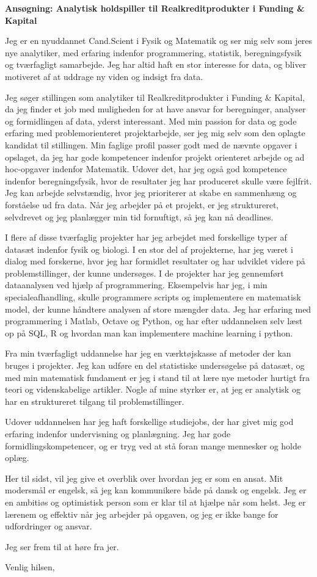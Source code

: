 \documentclass[12pt,a4paper]{letter}
\begin{document}
\begin{letter}{}
\opening{\textbf{Ansøgning: Analytisk holdspiller til Realkreditprodukter i Funding \& Kapital}} 

Jeg er en nyuddannet Cand.Scient i Fysik og Matematik og ser mig selv som jeres nye analytiker, med erfaring indenfor programmering, statistik, beregningsfysik og tværfagligt samarbejde. Jeg har altid haft en stor interesse for data, og bliver motiveret af at uddrage ny viden og indsigt fra data.

Jeg søger stillingen som analytiker til Realkreditprodukter i Funding \& Kapital, da jeg finder et job med muligheden for at have ansvar for beregninger, analyser og formidlingen af data, yderst interessant. Med min passion for data og gode erfaring med problemorienteret projektarbejde, ser jeg mig selv som den oplagte kandidat til stillingen. Min faglige profil passer godt med de nævnte opgaver i opslaget, da jeg har gode kompetencer indenfor projekt orienteret arbejde og ad hoc-opgaver indenfor Matematik. Udover det, har jeg også god kompetence indenfor beregningsfysik, hvor de resultater jeg har produceret skulle være fejlfrit. Jeg kan arbejde selvstændig, hvor jeg prioriterer at skabe en sammenhæng og forståelse ud fra data. Når jeg arbejder på et projekt, er jeg struktureret, selvdrevet og jeg planlægger min tid fornuftigt, så jeg kan nå deadlines.      

I flere af disse tværfaglig projekter har jeg arbejdet med forskellige typer af datasæt indenfor fysik og biologi. I en stor del af projekterne, har jeg været i dialog med forskerne, hvor jeg har formidlet resultater og har udviklet videre på problemstillinger, der kunne undersøges. I de projekter har jeg gennemført dataanalysen ved hjælp af programmering. Eksempelvis har jeg, i min specialeafhandling, skulle programmere scripts og implementere en matematisk model, der kunne håndtere analysen af store mængder data. Jeg har erfaring med programmering i Matlab, Octave og Python, og har efter uddannelsen selv læst op på SQL, R og hvordan man kan implementere machine learning i python. 

Fra min tværfagligt uddannelse har jeg en værktøjskasse af metoder der kan bruges i projekter. Jeg kan udføre en del statistiske undersøgelse på datasæt, og med min matematisk fundament er jeg i stand til at lære nye metoder hurtigt fra teori og videnskabelige artikler. Nogle af mine styrker er, at jeg er analytisk og har en struktureret tilgang til problemstillinger. 
 
Udover uddannelsen har jeg haft forskellige studiejobs, der har givet mig god erfaring indenfor undervisning og planlægning. Jeg har gode formidlingskompetencer, og er tryg ved at stå foran mange mennesker og holde oplæg.

Her til sidst, vil jeg give et overblik over hvordan jeg er som en ansat. Mit modersmål er engelsk, så jeg kan kommunikere både på dansk og engelsk. Jeg er en ambitiøs og optimistisk person som er klar til at hjælpe når som helst. Jeg er lærenem og effektiv når jeg arbejder på opgaven, og jeg er ikke bange for udfordringer og ansvar. 

Jeg ser frem til at høre fra jer.
\closing{Venlig hilsen,}

\end{letter}
\end{document}
